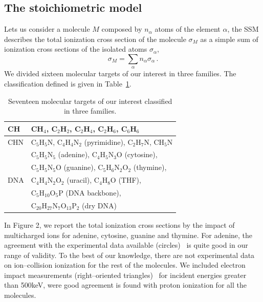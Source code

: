 \documentclass[preprint,12pt]{article}
\begin{document}
\subsection{The stoichiometric model}

Lets us consider a molecule $M$ composed by $n_{\alpha}$ atoms of the
element $\alpha$, the SSM describes the total ionization cross section 
of the molecule $\sigma_{M}$ as a simple sum of ionization cross 
sections of the isolated atoms $\sigma_{\alpha}$, 
\begin{equation}
 \sigma_{M}=\sum\limits_{\alpha}n_{\alpha}\sigma_{\alpha}\,.  
 \label{eq:sumion}
\end{equation}
We divided sixteen molecular targets of our interest in three families. 
The classification defined is given in Table~\ref{tab:families}.
\begin{table}
\begin{center}
\begin{tabular}{|p{}|p{}|}
\hline
 CH  & CH$_4$, C$_2$H$_2$, C$_2$H$_4$, C$_2$H$_6$, C$_6$H$_6$ \\
\hline
 CHN & C$_5$H$_5$N, C$_4$H$_4$N$_2$ (pyrimidine), C$_2$H$_7$N, CH$_5$N \\
\hline
 \multirow{5}{*}{DNA} 
     & C$_5$H$_5$N$_5$ (adenine), C$_4$H$_5$N$_3$O (cytosine), \\
     & C$_5$H$_5$N$_5$O (guanine), C$_5$H$_6$N$_2$O$_2$ (thymine), \\
     & C$_4$H$_4$N$_2$O$_2$ (uracil), C$_4$H$_8$O (THF), \\
     & C$_5$H$_{10}$O$_5$P (DNA backbone), \\
     & C$_{20}$H$_{27}$N$_7$O$_{13}$P$_2$ (dry DNA) \\
\hline
\end{tabular}
\caption{Seventeen molecular targets of our interest classified in three 
families.}
\label{tab:families}
\end{center}
\end{table}

In Figure 2, we report the total ionization cross sections by the 
impact of multicharged ions for adenine, cytosine, guanine and thymine. 
For adenine, the agreement with the experimental data 
available (circles)~\cite{iriki2011} is quite good in our range of validity. 
To the best of our knowledge, there are not experimental data on 
ion--collision ionization for the rest of the molecules. We included 
electron impact measurements (right--oriented triangles)~\cite{mozejko2003} 
for incident energies greater than 500keV, were good agreement is found 
with proton ionization for all the molecules. 
\end{document}
